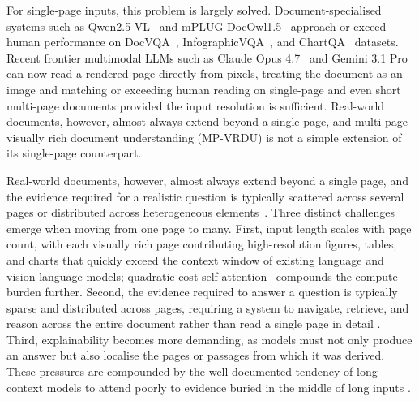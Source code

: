 \documentclass[11pt]{article}
\begin{document}
For single-page inputs, this problem is largely solved. Document-specialised systems such as Qwen2.5-VL~\cite{bai2025qwen2} and mPLUG-DocOwl1.5~\cite{hu2024mplug1.5} approach or exceed human performance on DocVQA~\cite{mathew2021docvqa}, InfographicVQA~\cite{mathew2022infographicvqa}, and ChartQA~\cite{masry2022chartqa} datasets. Recent frontier multimodal LLMs such as Claude Opus 4.7~\cite{anthropic2026opus47} and Gemini 3.1 Pro~\cite{google2026gemini31} can now read a rendered page directly from pixels, treating the document as an image and matching or exceeding human reading on single-page and even short multi-page documents provided the input resolution is sufficient. Real-world documents, however, almost always extend beyond a single page, and multi-page visually rich document understanding (MP-VRDU) is not a simple extension of its single-page counterpart.

Real-world documents, however, almost always extend beyond a single page, and the evidence required for a realistic question is typically scattered across several pages or distributed across heterogeneous elements~\cite{tito2023hierarchical,blau2024gram,borchmann2025arctic}. Three distinct challenges emerge when moving from one page to many. First, input length scales with page count, with each visually rich page contributing high-resolution figures, tables, and charts that quickly exceed the context window of existing language and vision-language models; quadratic-cost self-attention~\cite{vaswani2017attention} compounds the compute burden further. Second, the evidence required to answer a question is typically sparse and distributed across pages, requiring a system to navigate, retrieve, and reason across the entire document rather than read a single page in detail \cite{blau2024gram}. Third, explainability becomes more demanding, as models must not only produce an answer but also localise the pages or passages from which it was derived. These pressures are compounded by the well-documented tendency of long-context models to attend poorly to evidence buried in the middle of long inputs \cite{liu2024lost}.
\end{document}
